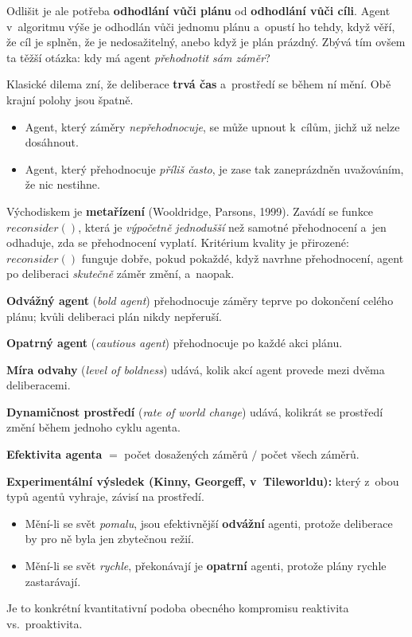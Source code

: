 \documentclass[11pt,a4paper]{article}
\theoremstyle{definition}
\begin{document}
Odlišit je ale potřeba \textbf{odhodlání vůči plánu} od \textbf{odhodlání vůči cíli}. Agent
v~algoritmu výše je odhodlán vůči jednomu plánu a~opustí ho tehdy, když věří, že cíl je splněn, že
je nedosažitelný, anebo když je plán prázdný. Zbývá tím ovšem ta těžší otázka: kdy má agent
\emph{přehodnotit sám záměr}?

Klasické dilema zní, že deliberace \textbf{trvá čas} a~prostředí se během ní mění. Obě krajní
polohy jsou špatně.
\begin{itemize}
\item Agent, který záměry \emph{nepřehodnocuje}, se může upnout k~cílům, jichž už nelze dosáhnout.
\item Agent, který přehodnocuje \emph{příliš často}, je zase tak zaneprázdněn uvažováním, že nic
  nestihne.
\end{itemize}

Východiskem je \textbf{metařízení} (Wooldridge, Parsons, 1999). Zavádí se funkce
$\mathit{reconsider}()$, která je \emph{výpočetně jednodušší} než samotné přehodnocení a~jen
odhaduje, zda se přehodnocení vyplatí. Kritérium kvality je přirozené: $\mathit{reconsider}()$
funguje dobře, pokud pokaždé, když navrhne přehodnocení, agent po deliberaci \emph{skutečně}
záměr změní, a~naopak.

\begin{defbox}
\textbf{Odvážný agent} (\emph{bold agent}) přehodnocuje záměry teprve po dokončení celého plánu;
kvůli deliberaci plán nikdy nepřeruší.

\textbf{Opatrný agent} (\emph{cautious agent}) přehodnocuje po každé akci plánu.

\textbf{Míra odvahy} (\emph{level of boldness}) udává, kolik akcí agent provede mezi dvěma
deliberacemi.

\textbf{Dynamičnost prostředí} (\emph{rate of world change}) udává, kolikrát se prostředí změní
během jednoho cyklu agenta.

\textbf{Efektivita agenta} $=$ počet dosažených záměrů $/$ počet všech záměrů.
\end{defbox}

\textbf{Experimentální výsledek (Kinny, Georgeff, v~Tileworldu):} který z~obou typů agentů vyhraje,
závisí na prostředí.
\begin{itemize}
\item Mění-li se svět \emph{pomalu}, jsou efektivnější \textbf{odvážní} agenti, protože deliberace
  by pro ně byla jen zbytečnou režií.
\item Mění-li se svět \emph{rychle}, překonávají je \textbf{opatrní} agenti, protože plány rychle
  zastarávají.
\end{itemize}
Je to konkrétní kvantitativní podoba obecného kompromisu reaktivita vs.\ proaktivita.
\end{document}
